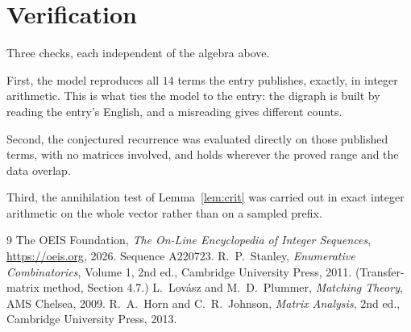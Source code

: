 \documentclass[11pt,a4paper]{article}
\theoremstyle{plain}
\theoremstyle{definition}
\begin{document}
\section{Verification}

Three checks, each independent of the algebra above.

First, the model reproduces all $14$ terms the entry publishes, exactly, in integer
arithmetic. This is what ties the model to the entry: the digraph is built by reading the
entry's English, and a misreading gives different counts.

Second, the conjectured recurrence was evaluated directly on those published terms, with no
matrices involved, and holds wherever the proved range and the data overlap.

Third, the annihilation test of Lemma~\ref{lem:crit} was carried out in exact integer
arithmetic on the whole vector rather than on a sampled prefix.

\begin{thebibliography}{9}
 The OEIS Foundation, \emph{The On-Line Encyclopedia of Integer
Sequences}, \url{https://oeis.org}, 2026. Sequence A220723.
 R.~P.~Stanley, \emph{Enumerative Combinatorics}, Volume 1, 2nd ed.,
Cambridge University Press, 2011. (Transfer-matrix method, Section 4.7.)
 L.~Lov\'asz and M.~D.~Plummer, \emph{Matching Theory}, AMS Chelsea,
2009.
 R.~A.~Horn and C.~R.~Johnson, \emph{Matrix Analysis}, 2nd ed., Cambridge
University Press, 2013.
\end{thebibliography}
\end{document}
